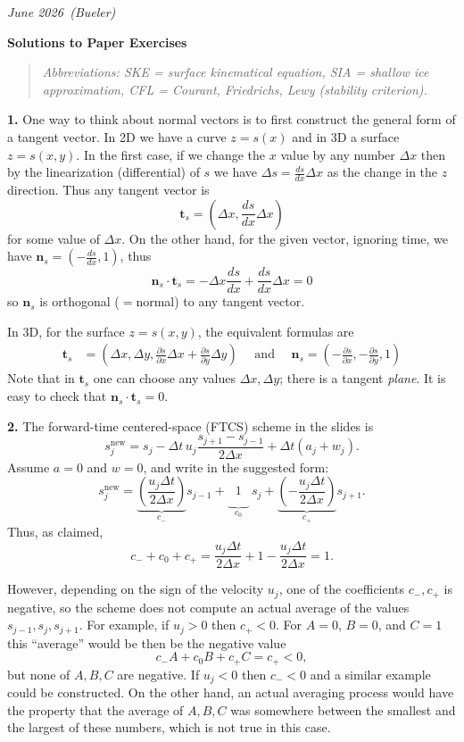 \documentclass[12pt]{amsart}
\newcommand{\bn}{\mathbf{n}}
\newcommand{\bt}{\mathbf{t}}
\newcommand{\prob}[1]{\bigskip\noindent\textbf{#1.}\quad }
\newcommand{\snew}{s^{\text{new}}}
\begin{document}
\scriptsize \hfill \emph{June 2026 \,(Bueler)}
\normalsize\medskip

\Large\centerline{\textbf{Solutions to Paper Exercises}}

\normalsize
\medskip
\begin{quote}
\emph{Abbreviations: SKE = surface kinematical equation, SIA = shallow ice approximation, CFL = Courant, Friedrichs, Lewy (stability criterion).}
\end{quote}

\prob{1}  One way to think about normal vectors is to first construct the general form of a tangent vector.  In 2D we have a curve $z=s(x)$ and in 3D a surface $z=s(x,y)$.  In the first case, if we change the $x$ value by any number $\Delta x$ then by the linearization (differential) of $s$ we have $\Delta s= \frac{ds}{dx} \Delta x$ as the change in the $z$ direction.  Thus any tangent vector is
	$$\bt_s = \left(\Delta x, \frac{ds}{dx} \Delta x\right)$$
for some value of $\Delta x$.  On the other hand, for the given vector, ignoring time, we have $\bn_s = (-\frac{ds}{dx},1)$, thus
	$$\bn_s \cdot \bt_s = -\Delta x \frac{ds}{dx} + \frac{ds}{dx} \Delta x = 0$$
so $\bn_s$ is orthogonal ($=$normal) to any tangent vector.

In 3D, for the surface $z=s(x,y)$, the equivalent formulas are
\begin{align*}
\bt_s &= \left(\Delta x, \Delta y, \frac{\partial s}{\partial x} \Delta x + \frac{\partial s}{\partial y} \Delta y\right) \quad \text{ and } \quad
\bn_s = \left(-\frac{\partial s}{\partial x},-\frac{\partial s}{\partial y},1\right)
\end{align*}
Note that in $\bt_s$ one can choose any values $\Delta x,\Delta y$; there is a tangent \emph{plane}.  It is easy to check that $\bn_s \cdot \bt_s = 0$.


\prob{2}  The forward-time centered-space (FTCS) scheme in the slides is
	$$\snew_j = s_j - \Delta t\, u_j \frac{s_{j+1}-s_{j-1}}{2\Delta x} + \Delta t (a_j + w_j).$$
Assume $a=0$ and $w=0$, and write in the suggested form:
	$$\snew_j = \underbrace{\left(\frac{u_j \Delta t}{2\Delta x}\right)}_{c_{-}} s_{j-1} + \underbrace{\phantom{\frac{1}{1}} 1 \phantom{\frac{1}{1}}}_{c_0}\, s_j + \underbrace{\left(-\frac{u_j \Delta t}{2\Delta x}\right)}_{c_{+}} s_{j+1}.$$
Thus, as claimed,
	$$c_-+c_0+c_+ = \frac{u_j \Delta t}{2\Delta x} + 1 - \frac{u_j \Delta t}{2\Delta x} = 1.$$

However, depending on the sign of the velocity $u_j$, one of the coefficients $c_-,c_+$ is negative, so the scheme does not compute an actual average of the values $s_{j-1},s_j,s_{j+1}$.  For example, if $u_j >0$ then $c_+<0$.  For $A=0$, $B=0$, and $C=1$ this ``average'' would be then be the negative value
	$$c_- A + c_0 B + c_+ C = c_+ < 0,$$
but none of $A,B,C$ are negative.  If $u_j<0$ then $c_-<0$ and a similar example could be constructed.  On the other hand, an actual averaging process would have the property that the average of $A,B,C$ was somewhere between the smallest and the largest of these numbers, which is not true in this case.
\end{document}
